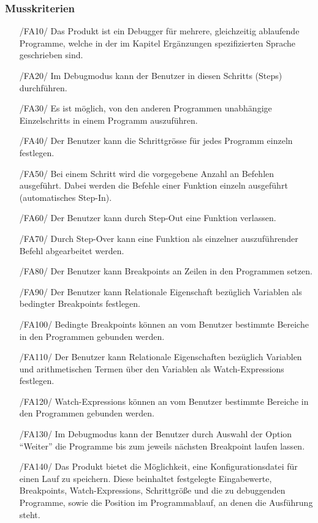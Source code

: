 \documentclass[parskip=full]{scrartcl}
\begin{document}
 		\subsubsection{Musskriterien}
		\begin{itemize}
		\item[/FA10/] Das Produkt ist ein \gls{Debugger} für mehrere, gleichzeitig ablaufende Programme, welche in der im Kapitel Ergänzungen spezifizierten Sprache geschrieben sind.
		\item[/FA20/] Im Debugmodus kann der Benutzer in diesen \glspl{Schritt} (Steps) durchführen.
		\item[/FA30/] Es ist möglich, von den anderen Programmen unabhängige \glspl{Einzelschritt} in einem Programm auszuführen.
                \item[/FA40/] Der Benutzer kann die \gls{Schrittgrösse} für jedes Programm einzeln festlegen.
		\item[/FA50/] Bei einem Schritt wird die vorgegebene Anzahl an Befehlen ausgeführt. Dabei werden die Befehle einer Funktion einzeln ausgeführt (automatisches Step-In). 
		\item[/FA60/] Der Benutzer kann durch \gls{Step-Out} eine Funktion verlassen.
		\item[/FA70/] Durch \gls{Step-Over} kann eine Funktion als einzelner auszuführender Befehl abgearbeitet werden.
		\item[/FA80/] Der Benutzer kann \glspl{Breakpoint} an Zeilen in den Programmen setzen.
                \item[/FA90/] Der Benutzer kann \gls{Relationale Eigenschaft} bezüglich Variablen als \glspl{bedingter Breakpoint} festlegen. %
		\item[/FA100/] Bedingte Breakpoints können an vom Benutzer bestimmte Bereiche in den Programmen gebunden werden.
		\item[/FA110/] Der Benutzer kann Relationale Eigenschaften bezüglich Variablen und arithmetischen Termen über den Variablen als \glspl{Watch-Expression} festlegen.
		\item[/FA120/] Watch-Expressions können an vom Benutzer bestimmte Bereiche in den Programmen gebunden werden.
		\item[/FA130/] Im \gls{Debugmodus} kann der Benutzer durch Auswahl der Option \enquote{Weiter} die Programme bis zum jeweils nächsten Breakpoint laufen lassen.
		\item[/FA140/] Das Produkt bietet die Möglichkeit, eine \gls{Konfigurationsdatei} für einen Lauf zu speichern. Diese beinhaltet festgelegte Eingabewerte, Breakpoints, Watch-Expressions, Schrittgröße und die zu debuggenden Programme, sowie die Position im Programmablauf, an denen die Ausführung steht.

\end{itemize}
\end{document}
